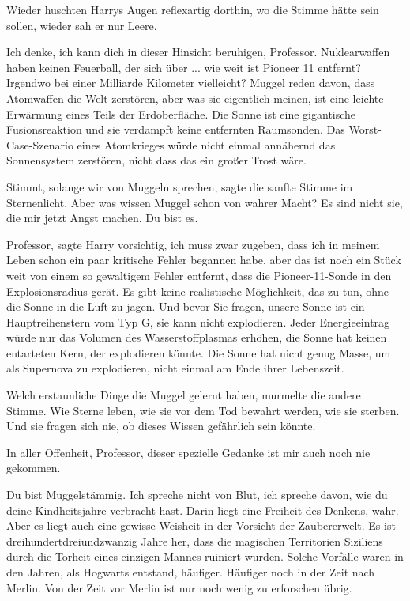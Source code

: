 Wieder huschten Harrys Augen reflexartig dorthin, wo die Stimme hätte sein
sollen, wieder sah er nur Leere.

\glqq{}Ich denke, ich kann dich in dieser Hinsicht beruhigen, Professor.
Nuklearwaffen haben keinen Feuerball, der sich über ... wie weit ist Pioneer 11
entfernt? Irgendwo bei einer Milliarde Kilometer vielleicht? Muggel reden davon,
dass Atomwaffen die Welt zerstören, aber was sie eigentlich meinen, ist eine
leichte Erwärmung eines Teils der Erdoberfläche. Die Sonne ist eine gigantische
Fusionsreaktion und sie verdampft keine entfernten Raumsonden. Das
Worst-Case-Szenario eines Atomkrieges würde nicht einmal annähernd das
Sonnensystem zerstören, nicht dass das ein großer Trost wäre.\grqq{}

\glqq{}Stimmt, solange wir von Muggeln sprechen\grqq{}, sagte die sanfte Stimme
im Sternenlicht. \glqq{}Aber was wissen Muggel schon von wahrer Macht? Es sind
nicht sie, die mir jetzt Angst machen. Du bist es.\grqq{}

\glqq{}Professor\grqq{}, sagte Harry vorsichtig, \glqq{}ich muss zwar zugeben,
dass ich in meinem Leben schon ein paar kritische Fehler begannen habe, aber das
ist noch ein Stück weit von einem so gewaltigem Fehler entfernt, dass die
Pioneer-11-Sonde in den Explosionsradius gerät. Es gibt keine realistische
Möglichkeit, das zu tun, ohne die Sonne in die Luft zu jagen. Und bevor Sie
fragen, unsere Sonne ist ein Hauptreihenstern vom Typ G, sie kann nicht
explodieren. Jeder Energieeintrag würde nur das Volumen des Wasserstoffplasmas
erhöhen, die Sonne hat keinen entarteten Kern, der explodieren könnte. Die Sonne
hat nicht genug Masse, um als Supernova zu explodieren, nicht einmal am Ende
ihrer Lebenszeit.\grqq{}

\glqq{}Welch erstaunliche Dinge die Muggel gelernt haben\grqq{}, murmelte die
andere Stimme. \glqq{}Wie Sterne leben, wie sie vor dem Tod bewahrt werden, wie
sie sterben. Und sie fragen sich nie, ob dieses Wissen gefährlich sein
könnte.\grqq{}

\glqq{}In aller Offenheit, Professor, dieser spezielle Gedanke ist mir auch noch
nie gekommen.\grqq{}

\glqq{}Du bist Muggelstämmig. Ich spreche nicht von Blut, ich spreche davon, wie
du deine Kindheitsjahre verbracht hast. Darin liegt eine Freiheit des Denkens,
wahr. Aber es liegt auch eine gewisse Weisheit in der Vorsicht der Zaubererwelt.
Es ist dreihundertdreiundzwanzig Jahre her, dass die magischen Territorien
Siziliens durch die Torheit eines einzigen Mannes ruiniert wurden. Solche
Vorfälle waren in den Jahren, als Hogwarts entstand, häufiger. Häufiger noch in
der Zeit nach Merlin. Von der Zeit vor Merlin ist nur noch wenig zu erforschen
übrig.\grqq{}

